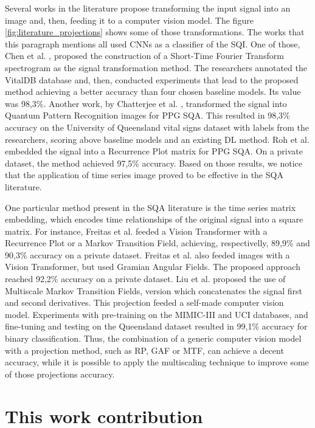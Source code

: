 Several works in the literature propose transforming the input signal into an image and, then, feeding it to a computer vision model. The figure \ref{fig:literature_projections} shows some of those transformations. The works that this paragraph mentions all used \gls{CNN}s as a classifier of the \gls{SQI}. One of those, Chen et al. \cite{imaging-1}, proposed the construction of a Short-Time Fourier Transform spectrogram as the signal transformation method. The researchers annotated the VitalDB database and, then, conducted experiments that lead to the proposed method achieving a better accuracy than four chosen baseline models. Its value was 98,3\%. Another work, by Chatterjee et al. \cite{imaging-2}, transformed the signal into Quantum Pattern Recognition images for PPG \gls{SQA}. This resulted in 98,3\% accuracy on the University of Queensland vital signs dataset with labels from the researchers, scoring above baseline models and an existing \gls{DL} method. Roh et al. \cite{imaging-3} embedded the signal into a Recurrence Plot matrix for PPG \gls{SQA}. On a private dataset, the method achieved 97,5\% accuracy. Based on those results, we notice that the application of time series image proved to be effective in the \gls{SQA} literature.  

One particular method present in the \gls{SQA} literature is the time series matrix embedding, which encodes time relationships of the original signal into a square matrix. For instance, Freitas et al. \cite{imaging-4} feeded a Vision Transformer with a Recurrence Plot or a Markov Transition Field, achieving, respectivelly, 89,9\% and 90,3\% accuracy on a private dataset. Freitas et al. \cite{imaging-5} also feeded images with a Vision Transformer, but used Gramian Angular Fields. The proposed approach reached 92,2\% accuracy on a private dataset. Liu et al. \cite{imaging-6} proposed the use of Multiscale Markov Transition Fields, version which concatenates the signal first and second derivatives. This projection feeded a self-made computer vision model. Experiments with pre-training on the MIMIC-III and UCI databases, and fine-tuning and testing on the Queensland dataset resulted in 99,1\% accuracy for binary classification. Thus, the combination of a generic computer vision model with a projection method, such as \gls{RP}, \gls{GAF} or \gls{MTF}, can achieve a decent accuracy, while it is possible to apply the multiscaling technique to improve some of those projections accuracy. 

\section{This work contribution}
\label{sec:my_work}

